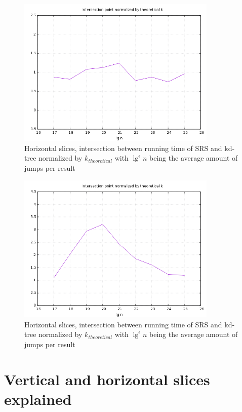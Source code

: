 \begin{figure}[h]
    \centering
    \includegraphics[width = 0.85\textwidth]{pictures/analysis/hori_theory.png}
    \caption{Horizontal slices, intersection between running time of SRS and kd-tree normalized by $k_{theoretical}$ with $\lg^\epsilon n$ being the average amount of jumps per result}\label{fig:hori_theory}
\end{figure}


\begin{figure}[h]
    \centering
    \includegraphics[width = 0.85\textwidth]{pictures/analysis/hori_theory_worst_jump.png}
    \caption{Horizontal slices, intersection between running time of SRS and kd-tree normalized by $k_{theoretical}$ with $\lg^\epsilon n$ being the average amount of jumps per result}\label{fig:hori_theory_worst_jump}
\end{figure}
\clearpage

\section{Vertical and horizontal slices explained}



